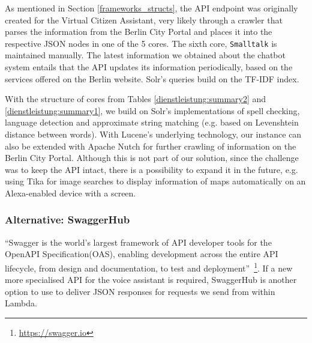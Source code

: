 As mentioned in Section \ref{frameworks_structs}, the API endpoint was originally created for the Virtual Citizen Assistant, very likely through a crawler %
that parses the information from the Berlin City Portal and places it into the respective JSON nodes in one of the 5 cores. The sixth core, \texttt{Smalltalk} is maintained manually. The latest information we obtained about the chatbot system entails that the API updates its information periodically, based on the services offered on the Berlin website. 
Solr's queries build on the TF-IDF index.


With the structure of cores from Tables \ref{dienstleistung:summary2} and \ref{dienstleistung:summary1}, we build on Solr's implementations of spell checking, language detection and approximate string matching (e.g. based on Levenshtein distance between words). With Lucene's underlying technology, our instance can also be extended with Apache Nutch for further crawling of information on the Berlin City Portal. Although this is not part of our solution, since the challenge was to keep the API intact, there is a possibility to expand it in the future, e.g. using Tika for image searches to display information of maps automatically on an Alexa-enabled device with a screen. %




%
%





\subsubsection*{Alternative: SwaggerHub}
 ``Swagger is the world’s largest framework of API developer tools for the OpenAPI Specification(OAS), enabling development across the entire API lifecycle, from design and documentation, to test and deployment''~\footnote{\url{https://swagger.io}}. 
 If a new more specialised API for the voice assistant is required, SwaggerHub is another option to use to deliver JSON responses for requests we send from within Lambda. 


